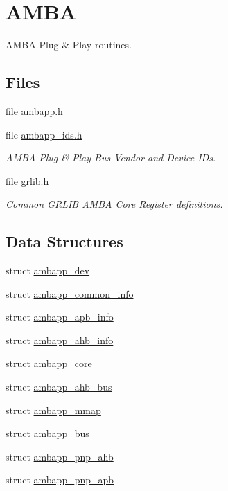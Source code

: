 \hypertarget{group__amba}{}\section{A\+M\+BA}
\label{group__amba}


A\+M\+BA Plug \& Play routines.  


\subsection*{Files}
\begin{DoxyCompactItemize}
\item 
file \mbox{\hyperlink{ambapp_8h}{ambapp.\+h}}
\item 
file \mbox{\hyperlink{ambapp__ids_8h}{ambapp\+\_\+ids.\+h}}
\begin{DoxyCompactList}\small\item\em A\+M\+BA Plug \& Play Bus Vendor and Device I\+Ds. \end{DoxyCompactList}\item 
file \mbox{\hyperlink{grlib_8h}{grlib.\+h}}
\begin{DoxyCompactList}\small\item\em Common G\+R\+L\+IB A\+M\+BA Core Register definitions. \end{DoxyCompactList}\end{DoxyCompactItemize}
\subsection*{Data Structures}
\begin{DoxyCompactItemize}
\item 
struct \mbox{\hyperlink{structambapp__dev}{ambapp\+\_\+dev}}
\item 
struct \mbox{\hyperlink{structambapp__common__info}{ambapp\+\_\+common\+\_\+info}}
\item 
struct \mbox{\hyperlink{structambapp__apb__info}{ambapp\+\_\+apb\+\_\+info}}
\item 
struct \mbox{\hyperlink{structambapp__ahb__info}{ambapp\+\_\+ahb\+\_\+info}}
\item 
struct \mbox{\hyperlink{structambapp__core}{ambapp\+\_\+core}}
\item 
struct \mbox{\hyperlink{structambapp__ahb__bus}{ambapp\+\_\+ahb\+\_\+bus}}
\item 
struct \mbox{\hyperlink{structambapp__mmap}{ambapp\+\_\+mmap}}
\item 
struct \mbox{\hyperlink{structambapp__bus}{ambapp\+\_\+bus}}
\item 
struct \mbox{\hyperlink{structambapp__pnp__ahb}{ambapp\+\_\+pnp\+\_\+ahb}}
\item 
struct \mbox{\hyperlink{structambapp__pnp__apb}{ambapp\+\_\+pnp\+\_\+apb}}
\end{DoxyCompactItemize}
